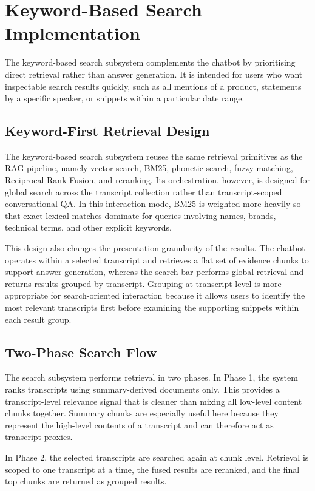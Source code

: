 \section{Keyword-Based Search Implementation}
The keyword-based search subsystem complements the chatbot by prioritising direct retrieval rather than answer generation. It is intended for users who want inspectable search results quickly, such as all mentions of a product, statements by a specific speaker, or snippets within a particular date range.

\subsection{Keyword-First Retrieval Design}
The keyword-based search subsystem reuses the same retrieval primitives as the RAG pipeline, namely vector search, BM25, phonetic search, fuzzy matching, Reciprocal Rank Fusion, and reranking. Its orchestration, however, is designed for global search across the transcript collection rather than transcript-scoped conversational QA. In this interaction mode, BM25 is weighted more heavily so that exact lexical matches dominate for queries involving names, brands, technical terms, and other explicit keywords.

This design also changes the presentation granularity of the results. The chatbot operates within a selected transcript and retrieves a flat set of evidence chunks to support answer generation, whereas the search bar performs global retrieval and returns results grouped by transcript. Grouping at transcript level is more appropriate for search-oriented interaction because it allows users to identify the most relevant transcripts first before examining the supporting snippets within each result group.

\subsection{Two-Phase Search Flow}
The search subsystem performs retrieval in two phases. In Phase 1, the system ranks transcripts using summary-derived documents only. This provides a transcript-level relevance signal that is cleaner than mixing all low-level content chunks together. Summary chunks are especially useful here because they represent the high-level contents of a transcript and can therefore act as transcript proxies.

In Phase 2, the selected transcripts are searched again at chunk level. Retrieval is scoped to one transcript at a time, the fused results are reranked, and the final top chunks are returned as grouped results.

